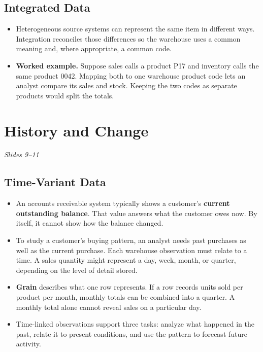 \documentclass[12pt,a4paper]{article}
\newcommand{\slides}[1]{\textit{\small #1}\par}
\begin{document}
\subsection{Integrated Data}
\begin{itemize}
\item Heterogeneous source systems can represent the same item in different ways. Integration reconciles those differences so the warehouse uses a common meaning and, where appropriate, a common code.
\item \textbf{Worked example.} Suppose sales calls a product P17 and inventory calls the same product 0042. Mapping both to one warehouse product code lets an analyst compare its sales and stock. Keeping the two codes as separate products would split the totals.
\end{itemize}

\newpage
\section{History and Change}
\slides{Slides 9--11}
\subsection{Time-Variant Data}
\begin{itemize}
\item An accounts receivable system typically shows a customer's \textbf{current outstanding balance}. That value answers what the customer owes now. By itself, it cannot show how the balance changed.
\item To study a customer's buying pattern, an analyst needs past purchases as well as the current purchase. Each warehouse observation must relate to a time. A sales quantity might represent a day, week, month, or quarter, depending on the level of detail stored.
\item \textbf{Grain} describes what one row represents. If a row records units sold per product per month, monthly totals can be combined into a quarter. A monthly total alone cannot reveal sales on a particular day.
\item Time-linked observations support three tasks: analyze what happened in the past, relate it to present conditions, and use the pattern to forecast future activity.
\end{itemize}
\end{document}

